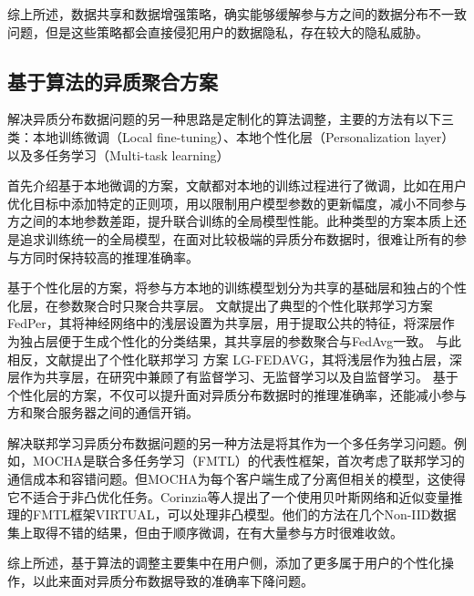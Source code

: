 综上所述，数据共享和数据增强策略，确实能够缓解参与方之间的数据分布不一致问题，但是这些策略都会直接侵犯用户的数据隐私，存在较大的隐私威胁。

\subsection{基于算法的异质聚合方案}
解决异质分布数据问题的另一种思路是定制化的算法调整，主要的方法有以下三类：本地训练微调（Local fine-tuning）\cite{hanzely2020federated, t2020personalized, huang2021personalized}、本地个性化层（Personalization layer）以及多任务学习（Multi-task learning）

首先介绍基于本地微调的方案，文献\cite{li2020federated, hanzely2020federated, t2020personalized, huang2021personalized}都对本地的训练过程进行了微调，比如在用户优化目标中添加特定的正则项，用以限制用户模型参数的更新幅度，减小不同参与方之间的本地参数差距，提升联合训练的全局模型性能。此种类型的方案本质上还是追求训练统一的全局模型，在面对比较极端的异质分布数据时，很难让所有的参与方同时保持较高的推理准确率。

基于个性化层的方案，将参与方本地的训练模型划分为共享的基础层和独占的个性化层，在参数聚合时只聚合共享层。
文献\cite{arivazhagan2019federated}提出了典型的个性化联邦学习方案FedPer，其将神经网络中的浅层设置为共享层，用于提取公共的特征，将深层作为独占层便于生成个性化的分类结果，其共享层的参数聚合与FedAvg一致。
与此相反，文献\cite{liang2020think}提出了个性化联邦学习
方案 LG-FEDAVG，其将浅层作为独占层，深层作为共享层，在研究中兼顾了有监督学习、无监督学习以及自监督学习。
基于个性化层的方案，不仅可以提升面对异质分布数据时的推理准确率，还能减小参与方和聚合服务器之间的通信开销。

解决联邦学习异质分布数据问题的另一种方法是将其作为一个多任务学习问题。例如，MOCHA\cite{smith2017federated}是联合多任务学习（FMTL）的代表性框架，首次考虑了联邦学习的通信成本和容错问题。但MOCHA为每个客户端生成了分离但相关的模型，这使得它不适合于非凸优化任务。Corinzia等人\cite{corinzia2019variational}提出了一个使用贝叶斯网络和近似变量推理的FMTL框架VIRTUAL，可以处理非凸模型。他们的方法在几个Non-IID数据集上取得不错的结果，但由于顺序微调，在有大量参与方时很难收敛。


综上所述，基于算法的调整主要集中在用户侧，添加了更多属于用户的个性化操作，以此来面对异质分布数据导致的准确率下降问题。

